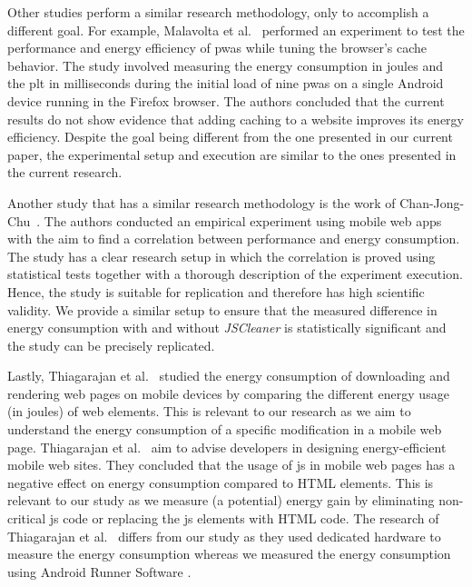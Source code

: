 Other studies perform a similar research methodology, only to accomplish a different goal. For example, Malavolta et al.~\cite{Evaluating_Caching} performed an experiment to test the performance and energy efficiency of \acrshort{pwas} while tuning the browser's cache behavior. The study involved measuring the energy consumption in joules and the \acrshort{plt} in milliseconds during the initial load of nine \acrshort{pwas} on a single Android device running in the Firefox browser. The authors concluded that the current results do not show evidence that adding caching to a website improves its energy efficiency. Despite the goal being different from the one presented in our current paper, the experimental setup and execution are similar to the ones presented in the current research.

Another study that has a similar research methodology is the work of Chan-Jong-Chu~\cite{chan2020investigating}. The authors conducted an empirical experiment using mobile web apps with the aim to find a correlation between performance and energy consumption. The study has a clear research setup in which the correlation is proved using statistical tests together with a thorough description of the experiment execution. Hence, the study is suitable for replication and therefore has high scientific validity. We provide a similar setup to ensure that the measured difference in energy consumption with and without \textit{JSCleaner} is statistically significant and the study can be precisely replicated.

Lastly, Thiagarajan et al.~\cite{thiagarajan2012battery} studied the energy consumption of downloading and rendering web pages on mobile devices by comparing the different energy usage (in joules) of web elements. This is relevant to our research as we aim to understand the energy consumption of a specific modification in a mobile web page. Thiagarajan et al.~\cite{thiagarajan2012battery} aim to advise developers in designing energy-efficient mobile web sites. They concluded that the usage of \acrshort{js} in mobile web pages has a negative effect on energy consumption compared to HTML elements. This is relevant to our study as we measure (a potential) energy gain by eliminating non-critical \acrshort{js} code or replacing the \acrshort{js} elements with HTML code. The research of Thiagarajan et al.~\cite{thiagarajan2012battery} differs from our study as they used dedicated hardware to measure the energy consumption whereas we measured the energy consumption using Android Runner Software \cite{malavolta2020runner}.



